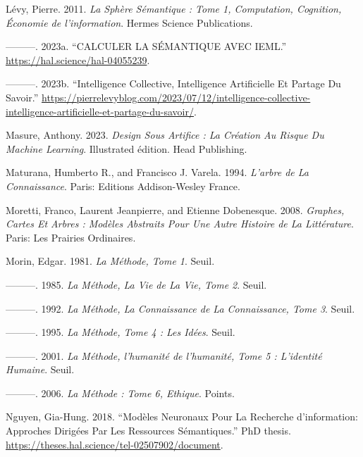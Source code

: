 \documentclass[
  letterpaper,
  DIV=11,
  numbers=noendperiod]{scrreprt}
\newlength{\cslhangindent}
\newlength{\cslentryspacingunit} %
\newenvironment{CSLReferences}[2] %
 {%
  \setlength{\parindent}{0pt}
  \ifodd #1
  \let\oldpar\par
  \def\par{\hangindent=\cslhangindent\oldpar}
  \fi
  \setlength{\parskip}{#2\cslentryspacingunit}
 }%
 {}
\begin{document}
\begin{CSLReferences}{1}{0}
\leavevmode{}%
Lévy, Pierre. 2011. \emph{La Sphère Sémantique : Tome 1, Computation,
Cognition, Économie de l'information}. Hermes Science Publications.

\leavevmode{}%
---------. 2023a. {``CALCULER LA SÉMANTIQUE AVEC IEML.''}
\url{https://hal.science/hal-04055239}.

\leavevmode{}%
---------. 2023b. {``Intelligence Collective, Intelligence Artificielle
Et Partage Du Savoir.''}
\url{https://pierrelevyblog.com/2023/07/12/intelligence-collective-intelligence-artificielle-et-partage-du-savoir/}.

\leavevmode{}%
Masure, Anthony. 2023. \emph{Design Sous Artifice : La Création Au
Risque Du Machine Learning}. Illustrated édition. Head Publishing.

\leavevmode{}%
Maturana, Humberto R., and Francisco J. Varela. 1994. \emph{L'arbre de
La Connaissance}. Paris: Editions Addison-Wesley France.

\leavevmode{}%
Moretti, Franco, Laurent Jeanpierre, and Etienne Dobenesque. 2008.
\emph{Graphes, Cartes Et Arbres : Modèles Abstraits Pour Une Autre
Histoire de La Littérature}. Paris: Les Prairies Ordinaires.

\leavevmode{}%
Morin, Edgar. 1981. \emph{La Méthode, Tome 1}. Seuil.

\leavevmode{}%
---------. 1985. \emph{La Méthode, La Vie de La Vie, Tome 2}. Seuil.

\leavevmode{}%
---------. 1992. \emph{La Méthode, La Connaissance de La Connaissance,
Tome 3}. Seuil.

\leavevmode{}%
---------. 1995. \emph{La Méthode, Tome 4 : Les Idées}. Seuil.

\leavevmode{}%
---------. 2001. \emph{La Méthode, l'humanité de l'humanité, Tome 5 :
L'identité Humaine}. Seuil.

\leavevmode{}%
---------. 2006. \emph{La Méthode : Tome 6, Ethique}. Points.

\leavevmode{}%
Nguyen, Gia-Hung. 2018. {``Modèles Neuronaux Pour La Recherche
d'information: Approches Dirigées Par Les Ressources Sémantiques.''} PhD
thesis. \url{https://theses.hal.science/tel-02507902/document}.


\end{CSLReferences}
\end{document}

